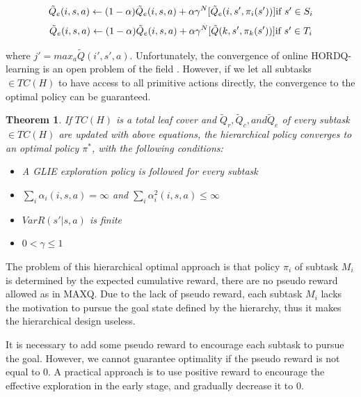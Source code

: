\documentclass{article} %
\newtheorem{theorem}{Theorem}
\begin{document}
\begin{equation}
    \tilde{Q}_e(i, s, a) \leftarrow 
        (1 - \alpha)\tilde{Q}_e(i, s, a) + \alpha \gamma^N[\tilde{Q}_e(i, s', \pi_i(s'))]  \mbox{if $s' \in S_i$} \\
\end{equation}
\begin{equation}
    \tilde{Q}_e(i, s, a) \leftarrow 
        (1 - \alpha)\tilde{Q}_e(i, s, a) + \alpha \gamma^N[\tilde{Q}(k, s', \pi_k(s'))]  \mbox{if $s' \in T_i$} \\
    \label{eq:TdQe}
\end{equation}


where $j' = max_a \tilde{Q}(i', s', a)$.
Unfortunately, the convergence of online HORDQ-learning is an open problem of the field \cite{HORDQ}.
However, if we let all subtasks $\in TC(H)$ to have access to all primitive actions directly, 
the convergence to the optimal policy can be guaranteed. 
\begin{theorem}
    If $TC(H)$ is a total leaf cover 
    and $\tilde{Q}_r, \tilde{Q}_c, and \tilde{Q}_e$ of every subtask $\in TC(H)$ are updated with above equations, 
    the hierarchical policy converges to an optimal policy $\pi^*$,
    with the following conditions:
    \begin{itemize}{}
    \item A GLIE exploration policy is followed for every subtask
    \item $\sum_i \alpha_i(i, s, a) = \infty$ and  $\sum_i \alpha_i^2(i, s, a) \le \infty$
    \item $Var{R(s' | s, a)}$ is finite 
    \item $0 < \gamma \le 1$
    \end{itemize}
\end{theorem}

The problem of this hierarchical optimal approach is that policy $\pi_i$ of subtask $M_i$
is determined by the expected cumulative reward, there are no pseudo reward allowed as
in MAXQ. Due to the lack of pseudo reward, each subtask $M_i$ lacks the motivation to 
pursue the goal state defined by the hierarchy, thus it makes the hierarchical 
design useless. 

It is necessary to add some pseudo reward to encourage each subtask to pursue 
the goal. However, we cannot guarantee optimality if the pseudo reward is not equal to 0.
A practical approach is to use positive reward to encourage the effective exploration
in the early stage, and gradually decrease it to 0. 
\end{document}

